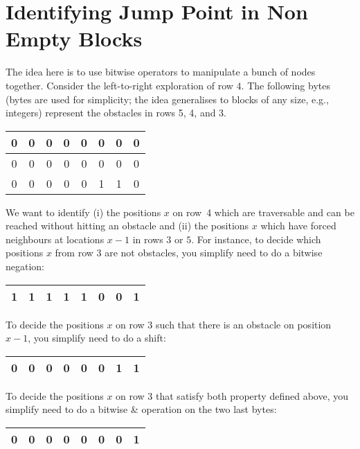 \documentclass{article}
\begin{document}
\section{Identifying Jump Point in Non Empty Blocks}

The idea here is to use bitwise operators
to manipulate a bunch of nodes together.  
Consider the left-to-right exploration of row $4$.  
The following bytes (bytes are used for simplicity; 
the idea generalises to blocks of any size, e.g., integers) 
represent the obstacles in rows 5, 4, and 3.  

\begin{center}
  \begin{tabular}{|c|c|c|c|c|c|c|c|}
    \hline
    0 & 0 & 0 & 0 & 0 & 0 & 0 & 0 \\
    \hline
    0 & 0 & 0 & 0 & 0 & 0 & 0 & 0 \\
    \hline
    0 & 0 & 0 & 0 & 0 & 1 & 1 & 0 \\
    \hline
  \end{tabular}
\end{center}

We want to identify (i) the positions $x$ on row~4 which are traversable and can
be reached without hitting an obstacle and (ii) the positions $x$ which have
forced neighbours at locations $x-1$ in rows $3$ or $5$.
For instance, to decide which positions $x$ from row 3 
are not obstacles, you simplify need to do a bitwise negation: 
\begin{center}
  \begin{tabular}{|c|c|c|c|c|c|c|c|}
    \hline
    1 & 1 & 1 & 1 & 1 & 0 & 0 & 1 \\
    \hline
  \end{tabular}
\end{center}
To decide the positions $x$ on row 3 
such that there is an obstacle on position $x-1$, 
you simplify need to do a shift: 
\begin{center}
  \begin{tabular}{|c|c|c|c|c|c|c|c|}
    \hline
    0 & 0 & 0 & 0 & 0 & 0 & 1 & 1 \\
    \hline
  \end{tabular}
\end{center}
To decide the positions $x$ on row 3 
that satisfy both property defined above, 
you simplify need to do a bitwise \& operation 
on the two last bytes: 
\begin{center}
  \begin{tabular}{|c|c|c|c|c|c|c|c|}
    \hline
    0 & 0 & 0 & 0 & 0 & 0 & 0 & 1 \\
    \hline
  \end{tabular}
\end{center}
\end{document}
